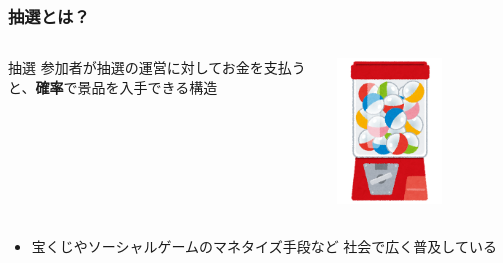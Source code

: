 \begin{frame}
  \frametitle{抽選とは？}

  \pause
  \begin{columns}
    \begin{column}{0.8\textwidth}
      \begin{block}{抽選}
        参加者が抽選の運営に対してお金を支払うと、\textbf{確率}で景品を入手できる構造
      \end{block}
    \end{column}
    \begin{column}{0.2\textwidth}
      \begin{center}
        \includegraphics[width=0.6\textwidth]{img/gachagacha.png}
      \end{center}
    \end{column}
  \end{columns}

  \pause
  \begin{itemize}
    \item 宝くじやソーシャルゲームのマネタイズ手段など
    社会で広く普及している
  \end{itemize}
  

\end{frame}
